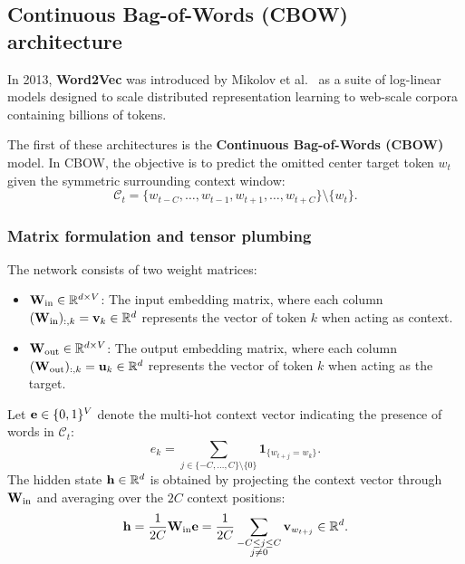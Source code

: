 \documentclass[../../main.tex]{subfiles}
\begin{document}
\clearpage

\subsection{Continuous Bag-of-Words (CBOW) architecture}
\label{sec:cbow_architecture}

In 2013, \textbf{Word2Vec} was introduced by Mikolov et al.~\cite{mikolov2013efficient,mikolov2013distributed} as a suite of log-linear models designed to scale distributed representation learning to web-scale corpora containing billions of tokens.

The first of these architectures is the \textbf{Continuous Bag-of-Words (CBOW)} model. In CBOW, the objective is to predict the omitted center target token $w_t$ given the symmetric surrounding context window:
\begin{equation}
\label{eq:cbow_context_def}
\mathcal{C}_t = \{w_{t-C}, \dots, w_{t-1}, w_{t+1}, \dots, w_{t+C}\} \setminus \{w_t\}.
\end{equation}

\subsubsection{Matrix formulation and tensor plumbing}
\label{subsec:cbow_math_formulation}

The network consists of two weight matrices:
\begin{itemize}
    \item $\mathbf{W}_{\text{in}} \in \mathbb{R}^{d \times V}$: The input embedding matrix, where each column $(\mathbf{W}_{\text{in}})_{:, k} = \mathbf{v}_k \in \mathbb{R}^d$ represents the vector of token $k$ when acting as context.
    \item $\mathbf{W}_{\text{out}} \in \mathbb{R}^{d \times V}$: The output embedding matrix, where each column $(\mathbf{W}_{\text{out}})_{:, k} = \mathbf{u}_k \in \mathbb{R}^d$ represents the vector of token $k$ when acting as the target.
\end{itemize}

Let $\mathbf{e} \in \{0, 1\}^V$ denote the multi-hot context vector indicating the presence of words in $\mathcal{C}_t$:
\begin{equation}
\label{eq:context_indicator}
e_k = \sum_{j \in \{-C, \dots, C\} \setminus \{0\}} \mathbf{1}_{\{w_{t+j} = w_k\}}.
\end{equation}
The hidden state $\mathbf{h} \in \mathbb{R}^d$ is obtained by projecting the context vector through $\mathbf{W}_{\text{in}}$ and averaging over the $2C$ context positions:
\begin{equation}
\label{eq:cbow_hidden_avg}
\mathbf{h} = \frac{1}{2C} \mathbf{W}_{\text{in}} \mathbf{e} = \frac{1}{2C} \sum_{\substack{-C \le j \le C \\ j \neq 0}} \mathbf{v}_{w_{t+j}} \in \mathbb{R}^d.
\end{equation}
\end{document}
